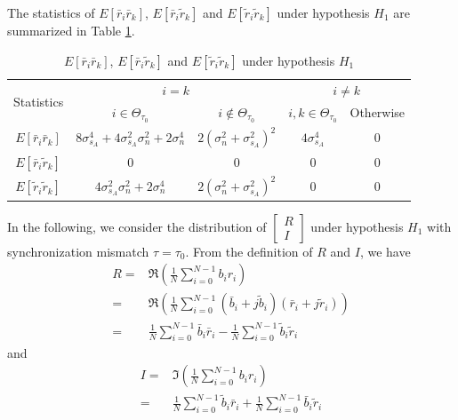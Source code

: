 The statistics of $E[\bar{r}_i\bar{r}_k]$, $E[\bar{r}_i\tilde{r}_k]$ and $E[\tilde{r}_i\tilde{r}_k]$ under hypothesis $H_1$ are summarized in Table \ref{Table3}. 
\begin{table}[h]
\centering
\begin{tabular}{|c|c|c|c|c|}
\hline
\multirow{2}{*}{Statistics} & \multicolumn{2}{c|}{$i = k$}                                                              & \multicolumn{2}{c|}{$i \neq k$}        \\ \cline{2-5} 
                            & $i\in \Theta_{\tau_0}$                                 & $i \notin \Theta_{\tau_0}$       & $i, k \in \Theta_{\tau_0}$ & Otherwise  \\ \hline
$E[\bar{r}_i\bar{r}_k]$     & $8\sigma_{s_A}^4+4\sigma_{s_A}^2\sigma_n^2+2\sigma_n^4$ & $2(\sigma_n^2+\sigma_{s_A}^2)^2$ & $4\sigma_{s_A}^4$          & $0$       \\ \hline
$E[\bar{r}_i\tilde{r}_k]$   & $0$                                                    & $0$                              & $0$                        & $0$       \\ \hline
$E[\tilde{r}_i\tilde{r}_k]$ & $4\sigma_{s_A}^2\sigma_n^2+2\sigma_n^4$                & $2(\sigma_n^2+\sigma_{s_A}^2)^2$ & $0$                        & $0$       \\ \hline
\end{tabular}
\caption{$E[\bar{r}_i\bar{r}_k]$, $E[\bar{r}_i\tilde{r}_k]$ and $E[\tilde{r}_i\tilde{r}_k]$ under hypothesis $H_1$}
\label{Table3}
\end{table}

In the following, we consider the distribution of $\begin{bmatrix}
  R \\
  I
\end{bmatrix}$ under hypothesis $H_1$ with synchronization mismatch $\tau = \tau_0$.
From the definition of $R$ and $I$, we have 
\begin{equation}
  \begin{split}
	R = &\Re{(\frac{1}{N}\sum_{i=0}^{N-1} b_ir_i)}\\
	= &\Re(\frac{1}{N}\sum_{i=0}^{N-1}(\bar{b}_i+j\tilde{b}_i)(\bar{r}_i+j\tilde{r}_i))\\
	= &\frac{1}{N}\sum_{i=0}^{N-1}\bar{b}_i\bar{r}_i - \frac{1}{N}\sum_{i=0}^{N-1}\tilde{b}_i\tilde{r}_i
  \end{split}
  \label{R}
\end{equation}
and
\begin{equation}
  \begin{split}
	I = &\Im(\frac{1}{N}\sum_{i=0}^{N-1} b_ir_i)\\
	= &\frac{1}{N}\sum_{i=0}^{N-1}\tilde{b}_i\bar{r}_i + \frac{1}{N}\sum_{i=0}^{N-1}\bar{b}_i\tilde{r}_i
  \end{split}
  \label{I}
\end{equation}

